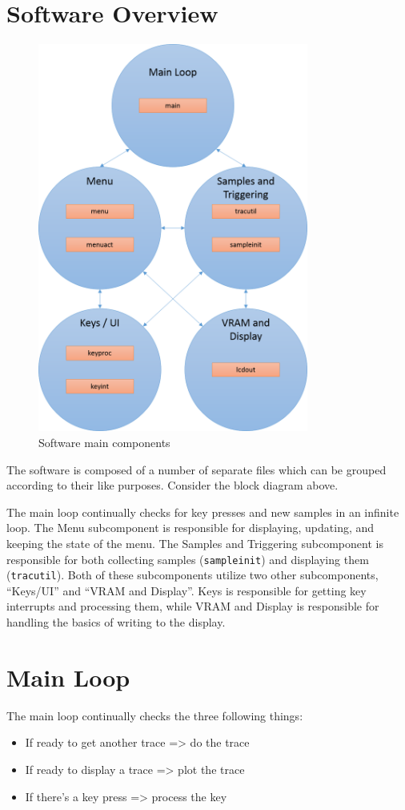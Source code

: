 \section{Software Overview}

\begin{figure}[ht!]
    \centering
    \includegraphics[width=3.5in]{block_diagrams/code.png}
		\caption{Software main components}
\end{figure}

\newpage

The software is composed of a number of separate files which can be grouped according to their like purposes. Consider the block diagram above.

The main loop continually checks for key presses and new samples in an infinite loop. The Menu subcomponent is responsible for displaying, updating, and keeping the state of the menu. The Samples and Triggering subcomponent is responsible for both collecting samples (\verb=sampleinit=) and displaying them (\verb=tracutil=). Both of these subcomponents utilize two other subcomponents, ``Keys/UI'' and ``VRAM and Display''. Keys is responsible for getting key interrupts and processing them, while VRAM and Display is responsible for handling the basics of writing to the display.

\section{Main Loop}
The main loop continually checks the three following things:
\begin{itemize}
	\item If ready to get another trace => do the trace
	\item If ready to display a trace => plot the trace
	\item If there's a key press => process the key
\end{itemize}

